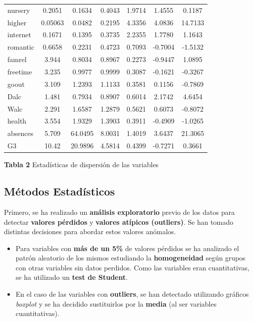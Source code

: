 \documentclass[a4paper, 11pt]{article}
\begin{document}
\begin{center}
\begin{tabular}{lcccccc}
nursery      & 0.2051 & 0.1634 & 0.4043 & 1.9714 & 1.4555 & 0.1187 \\ 
higher       & 0.05063 & 0.0482 & 0.2195 & 4.3356 & 4.0836 & 14.7133 \\ 
internet     & 0.1671 & 0.1395 & 0.3735 & 2.2355 & 1.7780 & 1.1643 \\ 
romantic     & 0.6658 & 0.2231 & 0.4723 & 0.7093 & -0.7004 & -1.5132 \\ 
famrel       & 3.944  & 0.8034 & 0.8967 & 0.2273 & -0.9447 & 1.0895 \\ 
freetime     & 3.235  & 0.9977 & 0.9999 & 0.3087 & -0.1621 & -0.3267 \\ 
goout        & 3.109  & 1.2393 & 1.1133 & 0.3581 & 0.1156 & -0.7869 \\ 
Dalc         & 1.481  & 0.7934 & 0.8907 & 0.6014 & 2.1742 & 4.6454 \\ 
Walc         & 2.291  & 1.6587 & 1.2879 & 0.5621 & 0.6073 & -0.8072 \\ 
health       & 3.554  & 1.9329 & 1.3903 & 0.3911 & -0.4909 & -1.0265 \\ 
absences     & 5.709  & 64.0495 & 8.0031 & 1.4019 & 3.6437 & 21.3065 \\ 
G3           & 10.42  & 20.9896 & 4.5814 & 0.4399 & -0.7271 & 0.3661 \\ 
\bottomrule
\end{tabular}

\textbf{Tabla 2} Estadísticas de dispersión de las variables

\end{center}

\subsection{Métodos Estadísticos}

Primero, se ha realizado un \textbf{análisis exploratorio} previo de los datos para detectar \textbf{valores pérdidos} y \textbf{valores atípicos (outliers)}. Se han tomado distintas decisiones para abordar estos valores anómalos.

\newpage

\begin{itemize}
\item Para variables con \textbf{más de un 5\%} de valores pérdidos se ha analizado el patrón aleatorio de los mismos estudiando la \textbf{homogeneidad} según grupos con otras variables sin datos perdidos. Como las variables eran cuantitativas, se ha utilizado un \textbf{test de Student}.

\item En el caso de las variables con \textbf{outliers}, se han detectado utilizando gráficos \textit{boxplot} y se ha decidido sustituirlos por la \textbf{media} (al ser variables cuantitativas).
\end{itemize} 
\end{document}

